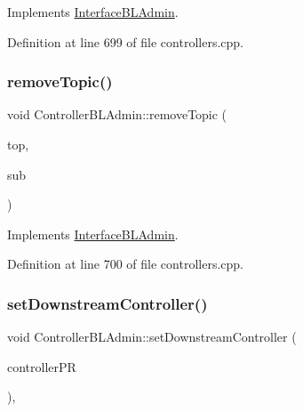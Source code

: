 Implements \hyperlink{class_interface_b_l_admin_aed60dd105ebed648c834d57c6b1c9224}{Interface\+B\+L\+Admin}.



Definition at line 699 of file controllers.\+cpp.

\mbox{\label{class_controller_b_l_admin_a615837120d6e4ba94fa32f13d2e8fac1}} 
\subsubsection{\texorpdfstring{remove\+Topic()}{removeTopic()}}
{\footnotesize\ttfamily void Controller\+B\+L\+Admin\+::remove\+Topic (\begin{DoxyParamCaption}\item[{\hyperlink{class_topic}{Topic} $\ast$}]{top,  }\item[{\hyperlink{class_subject}{Subject} $\ast$}]{sub }\end{DoxyParamCaption})\hspace{0.3cm}{\ttfamily [virtual]}}



Implements \hyperlink{class_interface_b_l_admin_a9ec942ebf3eb4a742de514801a378aca}{Interface\+B\+L\+Admin}.



Definition at line 700 of file controllers.\+cpp.

\mbox{\label{class_controller_b_l_admin_a372a88e17194ff8c2224f50b2862f35d}} 
\subsubsection{\texorpdfstring{set\+Downstream\+Controller()}{setDownstreamController()}}
{\footnotesize\ttfamily void Controller\+B\+L\+Admin\+::set\+Downstream\+Controller (\begin{DoxyParamCaption}\item[{\hyperlink{class_stub_p_r}{Stub\+PR} $\ast$}]{controller\+PR }\end{DoxyParamCaption})\hspace{0.3cm}{\ttfamily [inline]}, {\ttfamily [virtual]}}



